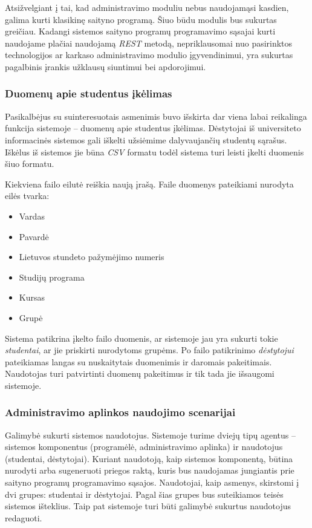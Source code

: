 \documentclass{VUMIFPSbakalaurinis}
\begin{document}
Atsižvelgiant į tai, kad administravimo moduliu nebus naudojamąsi kasdien, galima kurti klasikinę saityno programą. Šiuo būdu modulis bus sukurtas greičiau. Kadangi sistemos saityno programų programavimo sąsajai kurti naudojame plačiai naudojamą \textit{REST} metodą, nepriklausomai nuo pasirinktos technologijos ar karkaso administravimo modulio įgyvendinimui, yra sukurtas pagalbinis įrankis užklausų siuntimui bei apdorojimui.

\subsubsection{Duomenų apie studentus įkėlimas} \label{data-import}

Pasikalbėjus su suinteresuotais asmenimis buvo išskirta dar viena labai reikalinga funkcija sistemoje – duomenų apie studentus įkėlimas. Dėstytojai iš universiteto informacinės sistemos gali iškelti užsiėmime dalyvaujančių studentų sąrašus. Iškėlus iš sistemos jie būna \textit{CSV} formatu todėl sistema turi leisti įkelti duomenis šiuo formatu.

Kiekviena failo eilutė reiškia naują įrašą. Faile duomenys pateikiami nurodyta eilės tvarka:

\begin{itemize}
    \item Vardas
    \item Pavardė
    \item Lietuvos stundeto pažymėjimo numeris
    \item Studijų programa
    \item Kursas
    \item Grupė
\end{itemize}

Sistema patikrina įkelto failo duomenis, ar sistemoje jau yra sukurti tokie \textit{studentai}, ar jie priskirti nurodytoms grupėms. Po failo patikrinimo \textit{dėstytojui} pateikiamas langas su nuskaitytais duomenimis ir daromais pakeitimais. Naudotojas turi patvirtinti duomenų pakeitimus ir tik tada jie išsaugomi sistemoje.

\subsubsection{Administravimo aplinkos naudojimo scenarijai}


Galimybė sukurti sistemos naudotojus. Sistemoje turime dviejų tipų agentus – sistemos komponentus (programėlė, administravimo aplinka) ir naudotojus (studentai, dėstytojai). Kuriant naudotoją, kaip sistemos komponentą, būtina nurodyti arba sugeneruoti priegos raktą, kuris bus naudojamas jungiantis prie saityno programų programavimo sąsajos. Naudotojai, kaip asmenys, skirstomi į dvi grupes: studentai ir dėstytojai. Pagal šias grupes bus suteikiamos teisės sistemos išteklius. Taip pat sistemoje turi būti galimybė sukurtus naudotojus redaguoti.
\end{document}
